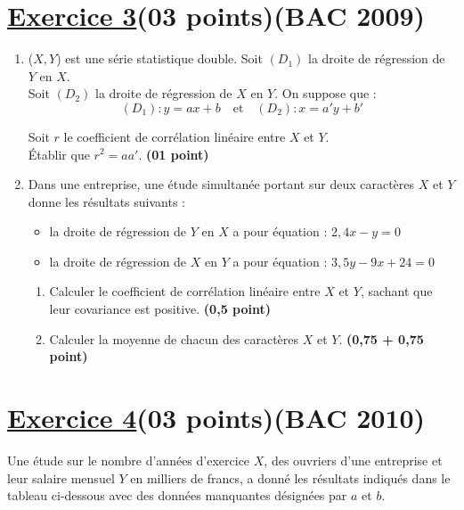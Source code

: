 \documentclass[12pt,a4paper]{article}
\begin{document}
\section*{\underline{Exercice 3}(03 points)(BAC 2009)}

\vspace{0.3cm}

\begin{enumerate}
    \item (\(X, Y\)) est une série statistique double. Soit \( (D_1) \) la droite de régression de \( Y \) en \( X \).\\

    Soit \( (D_2) \) la droite de régression de \( X \) en \( Y \). On suppose que :
    \[
    (D_1) : y = a x + b \quad \text{et} \quad (D_2) : x = a' y + b'
    \]
    
    Soit \( r \) le coefficient de corrélation linéaire entre \( X \) et \( Y \).\\
    
    Établir que \( r^2 = aa' \). \hfill \textbf{(01 point)}
    
    \item Dans une entreprise, une étude simultanée portant sur deux caractères \( X \) et \( Y \) donne les résultats suivants :
    \begin{itemize}
        \item la droite de régression de \( Y \) en \( X \) a pour équation : \( 2{,}4x - y = 0 \)
        \item la droite de régression de \( X \) en \( Y \) a pour équation : \( 3{,}5y - 9x + 24 = 0 \)
    \end{itemize}

    \begin{enumerate}
        \item Calculer le coefficient de corrélation linéaire entre \( X \) et \( Y \), sachant que leur covariance est positive. \hfill \textbf{(0,5 point)}
        
        \item Calculer la moyenne de chacun des caractères \( X \) et \( Y \). \hfill \textbf{(0,75 + 0,75 point)}
    \end{enumerate}
\end{enumerate}
\section*{\underline{Exercice 4}(03 points)(BAC 2010)}
Une étude sur le nombre d’années d’exercice \( X \), des ouvriers d’une entreprise et leur salaire mensuel \( Y \) en milliers de francs, a donné les résultats indiqués dans le tableau ci-dessous avec des données manquantes désignées par \( a \) et \( b \).
\end{document}
